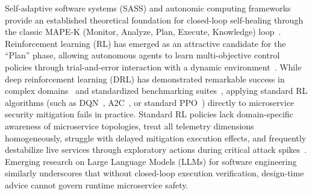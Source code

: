 \documentclass[ASNA,twocolumn]{USG}
\begin{document}
Self-adaptive software systems (SASS) and autonomic computing frameworks provide an established theoretical foundation for closed-loop self-healing through the classic MAPE-K (Monitor, Analyze, Plan, Execute, Knowledge) loop~\cite{salehie2009self, garlan2004rainbow, schneider2015survey}. Reinforcement learning (RL) has emerged as an attractive candidate for the ``Plan'' phase, allowing autonomous agents to learn multi-objective control policies through trial-and-error interaction with a dynamic environment~\cite{sutton1998reinforcement, mnih2015human}. While deep reinforcement learning (DRL) has demonstrated remarkable success in complex domains~\cite{silver2016mastering, mnih2016asynchronous} and standardized benchmarking suites~\cite{towers2026gymnasium, raffin2021stable}, applying standard RL algorithms (such as DQN~\cite{mnih2015human}, A2C~\cite{mnih2016asynchronous}, or standard PPO~\cite{schulman2017ppo}) directly to microservice security mitigation fails in practice. Standard RL policies lack domain-specific awareness of microservice topologies, treat all telemetry dimensions homogeneously, struggle with delayed mitigation execution effects, and frequently destabilize live services through exploratory actions during critical attack spikes~\cite{zheng2025proximal, standen2021cyborg, nguyen2021deep, xiao2018iot}. Emerging research on Large Language Models (LLMs) for software engineering~\cite{hou2024large} similarly underscores that without closed-loop execution verification, design-time advice cannot govern runtime microservice safety.
\end{document}
